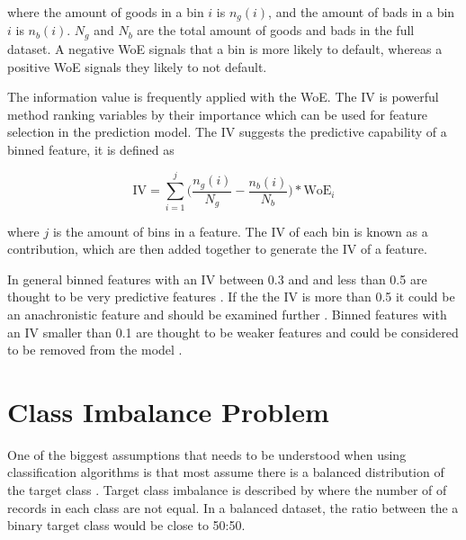 where the amount of goods in a bin $i$ is $n_g(i)$, and the amount of bads in a bin $i$ is $n_b(i)$. $N_g$ and $N_b$ are the total amount of goods and bads in the full dataset. A negative WoE signals that a bin is more likely to default, whereas a positive WoE signals they likely to not default.

The information value is frequently applied with the WoE. The IV is powerful method ranking variables by their importance which can be used for feature selection in the prediction model. The IV suggests the predictive capability of a binned feature, it is defined as  
 
\begin{equation} \label{eq:informatoValue}
\text{IV} =  \sum\limits_{i=1}^j \bigg(\frac{n_g(i)}{N_g} -   \frac{n_b(i)}{N_b}\bigg) * \text{WoE$_i$}
\end{equation}

where $j$ is the amount of bins in a feature. The IV of each bin is known as a contribution, which are then added together to generate the IV of a feature.

In general binned features with an IV between 0.3 and and less than 0.5 are thought to be very predictive features \citep{mays_credit_2004}. If the the IV is more than 0.5 it could be an anachronistic feature and should be examined further \citep{siddiqi_credit_2012}. Binned features with an IV smaller than 0.1 are thought to be weaker features and could be considered to be removed from the model \citep{anderson_credit_2007}.

\begin{comment}
\subsection{Correlation-based Feature Selection}
\subsection{Information Gain}
\subsection{Coarse Classification/ Binning}
\end{comment}

\section{Class Imbalance Problem}\label{sec:imBalance}
One of the biggest assumptions that needs to be understood when using classification algorithms is that most assume there is a balanced distribution of the target class \citep{japkowicz_class_2000}. Target class imbalance is described by  \citep{chawla_smote:_2002} where the number of  of records in each class are not equal. In a balanced dataset, the ratio between the a binary target class would be close to 50:50. 

